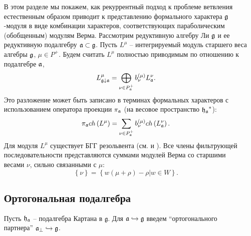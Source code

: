 \documentclass[12pt]{article}
\theoremstyle{definition}
\begin{document}
В этом разделе мы покажем, как рекуррентный подход к проблеме ветвления естественным образом приводит к представлению формального характера $\frak{g}$-модуля в виде комбинации характеров, соответствующих параболическим (обобщенным) модулям Верма. Рассмотрим редуктивную алгебру Ли  $\frak{g}$ и ее редуктивную подалгебру $\frak{a}\subset \frak{g}$.
Пусть  $L^{\mu} $ -- интегрируемый модуль старшего веса алгебры  $\frak{g}$, $\mu \in P^{+}$.  Будем считать  $L^{\mu}$ полностью приводимым по отношению к подалгебре $\frak{a}$,
\begin{equation*}
L_{\frak{g}\downarrow \frak{a}}^{\mu }=\bigoplus\limits_{\nu \in P_{\frak{a}%
}^{+}}b_{\nu }^{\left( \mu \right) }L_{\frak{a}}^{\nu }.
\end{equation*}
Это разложение может быть записано в терминах формальных характеров с использованием оператора проекции  $\pi _{\frak{a}}$ (на весовое пространство $\frak{h_{a}}^{\ast }$):
\begin{equation}
\pi _{\frak{a}}ch\left( L^{\mu }\right) =\sum_{\nu \in P_{\frak{a}%
}^{+}}b_{\nu }^{(\mu )}ch\left( L_{\frak{a}}^{\nu }\right) .
\label{branching1}
\end{equation}
Для модуля  $L^{\mu }$ существует БГГ резольвента (см. \cite
{bernstein1976category,bernstein1975differential,bernstein1971structure} и
\cite{humphreys2008representations}). Все члены фильтрующей последовательности представляются суммами модулей Верма со старшими весами $\nu$, сильно связанными с $\mu$:
\begin{equation*}
\left\{ \nu \right\} =\left\{ w\left( \mu +\rho \right) -\rho |w\in
W\right\} .
\end{equation*}

\subsection{Ортогональная подалгебра}

Пусть  $\frak{h}_{\frak{a}}$ -- подалгебра Картана в  $\mathfrak{g}$. Для  $\mathfrak{a}\hookrightarrow \frak{g}$ введем ``ортогонального партнера''  $\mathfrak{a}_{\bot }\hookrightarrow \frak{g}$.
\end{document}
